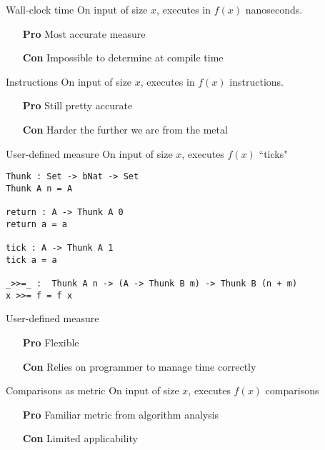 \documentclass[11pt]{beamer}
\begin{document}
    \begin{frame}{Wall-clock time}
        On input of size $x$, executes in $f(x)$ nanoseconds.

        \begin{itemize}[leftmargin=3em]
            \item[\textbf{Pro}] Most accurate measure
            \item[\textbf{Con}] Impossible to determine at compile time
        \end{itemize}
    \end{frame}

    \begin{frame}{Instructions}
        On input of size $x$, executes in $f(x)$ instructions.

        \begin{itemize}[leftmargin=3em]
            \item[\textbf{Pro}] Still pretty accurate
            \item[\textbf{Con}] Harder the further we are from the metal
        \end{itemize}
    \end{frame}

    \begin{frame}[fragile]{User-defined measure}
        On input of size $x$, executes $f(x)$ ``ticks"

        \begin{lstlisting}[emph={Thunk,tick, return}]
Thunk : Set -> bNat -> Set
Thunk A n = A

return : A -> Thunk A 0
return a = a

tick : A -> Thunk A 1
tick a = a

_>>=_ :  Thunk A n -> (A -> Thunk B m) -> Thunk B (n + m)
x >>= f = f x
        \end{lstlisting}
    \end{frame}

    \begin{frame}{User-defined measure}
        \begin{itemize}[leftmargin=3em]
            \item[\textbf{Pro}] Flexible
            \item[\textbf{Con}] Relies on programmer to manage time correctly
        \end{itemize}
    \end{frame}

    \begin{frame}{Comparisons as metric}
        On input of size $x$, executes $f(x)$ comparisons

        \begin{itemize}[leftmargin=3em]
            \item[\textbf{Pro}] Familiar metric from algorithm analysis
            \item[\textbf{Con}] Limited applicability
        \end{itemize}
    \end{frame}
\end{document}
